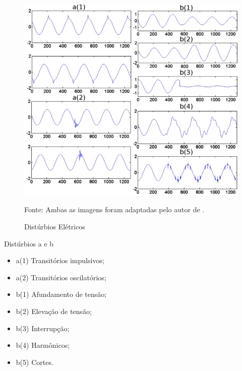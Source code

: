 \begin{figure}[hbt]
\begin{center}
\caption{Distúrbios Elétricos}
\includegraphics[width=12cm]{imagens/Imagema-final-AB2.jpg}
\par{\small Fonte: Ambas as imagens foram adaptadas pelo autor de \cite{FER10}.}
\label{fig:tiposperturbações}
\end{center}
\end{figure}
\par Distúrbios a e b
\begin{itemize}
\item a(1) Transitórios impulsivos;
\item a(2) Transitórios oscilatórios;
\item b(1) Afundamento de tensão;
\item b(2) Elevação de tensão;
\item b(3) Interrupção;
\item b(4) Harmônicos;
\item b(5) Cortes.
\end{itemize}
